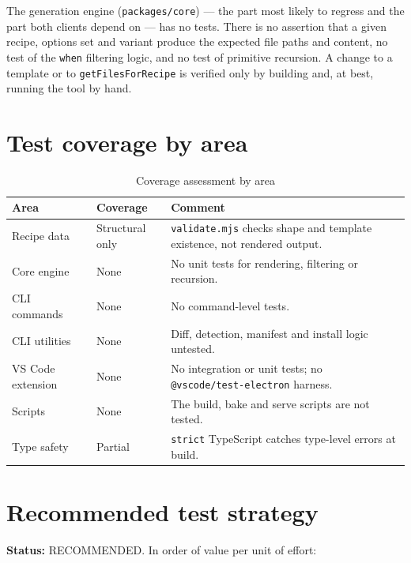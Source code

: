 The generation engine (\texttt{packages/core}) --- the part most likely to
regress and the part both clients depend on --- has no tests. There is no
assertion that a given recipe, options set and variant produce the expected
file paths and content, no test of the \texttt{when} filtering logic, and no
test of primitive recursion. A change to a template or to
\texttt{getFilesForRecipe} is verified only by building and, at best, running the
tool by hand.

\section{Test coverage by area}

\begin{longtable}{p{4cm}p{2.6cm}p{7.6cm}}
\caption{Coverage assessment by area}\\
\toprule
\textbf{Area} & \textbf{Coverage} & \textbf{Comment} \\
\midrule

Recipe data & Structural only & \texttt{validate.mjs} checks shape and template
existence, not rendered output. \\
Core engine & None & No unit tests for rendering, filtering or recursion. \\
CLI commands & None & No command-level tests. \\
CLI utilities & None & Diff, detection, manifest and install logic untested. \\
VS Code extension & None & No integration or unit tests; no
\texttt{@vscode/test-electron} harness. \\
Scripts & None & The build, bake and serve scripts are not tested. \\
Type safety & Partial & \texttt{strict} TypeScript catches type-level errors at
build. \\
\bottomrule
\end{longtable}

\section{Recommended test strategy}

\textbf{Status:} RECOMMENDED. In order of value per unit of effort:

